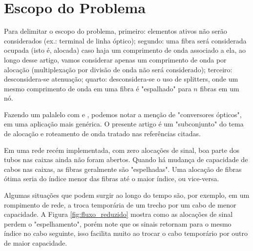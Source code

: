 \section{Escopo do Problema} \label{sec:problem}

Para delimitar o escopo do problema, primeiro: elementos ativos não serão
considerados (ex.: terminal de linha óptico); segundo: uma fibra será
considerada ocupada (isto é, alocada) caso haja um comprimento de onda
associado a ela, ao longo desse artigo, vamos considerar apenas um comprimento
de onda por alocação (multiplexação por divisão de onda não será considerado);
terceiro: desconsidera-se atenuação; quarto: desconsidera-se o uso de
splitters, onde um mesmo comprimento de onda em uma fibra é "espalhado" para
$n$ fibras em um nó.

Fazendo um palalelo com \cite{artigorwa} e \cite{zang2000review}, podemos notar
a menção de "conversores ópticos", em uma aplicação mais genérica. O presente
artigo é um "subconjunto" do tema de alocação e roteamento de onda tratado nas
referências citadas.

Em uma rede recém implementada, com zero alocações de sinal, boa parte dos tubos 
nas caixas ainda não foram abertos. Quando há mudança de capacidade de cabos nas
caixas, as fibras geralmente são "espelhadas". Uma alocação de fibras ótima
seria do índice menor das fibras até o maior índice, ou vice-versa.

Algumas situações que podem surgir ao longo do tempo são, por exemplo, em um
rompimento de rede, a troca temporária de um trecho por um cabo de menor 
capacidade. A Figura \ref{fig:fluxo_reduzido} mostra como as alocações de sinal
perdem o "espelhamento", porém note que os sinais retornam para o mesmo índice
no cabo seguinte, isso facilita muito ao trocar o cabo temporário por outro de
maior capacidade.

